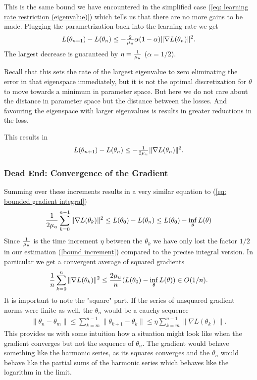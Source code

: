 %
This is the same bound we have encountered in the simplified case (\ref{eq:
learning rate restriction (eigenvalue)}) which tells us that there are no more
gains to be made. Plugging the parametrization back into the learning rate we
get
%
\begin{align*}
	L(\theta_{n+1}) - L(\theta_n)
	\le - \tfrac{2}{\mu_u}\alpha (1-\alpha)\|\nabla L(\theta_n)\|^2.
\end{align*}
%
The largest decrease is guaranteed by \(\eta=\tfrac{1}{\mu_u}\) (\(\alpha=1/2\)).
\begin{remark}
	Recall that this sets the rate of the largest eigenvalue to zero eliminating
	the error in that eigenspace immediately, but it is not the optimal
	discretization for \(\theta\) to move towards a minimum in parameter space.
	But here we do not care about the distance in parameter space but the
	distance between the losses. And favouring the eigenspace with larger
	eigenvalues is results in greater reductions in the loss.
\end{remark}
This results in
%
\begin{align*}
	L(\theta_{n+1}) - L(\theta_n)
	\le - \tfrac{1}{2\mu_u}\|\nabla L(\theta_n)\|^2.
\end{align*}
%
\subsubsection{Dead End: Convergence of the Gradient}

Summing over these increments results in a very similar equation to
(\ref{eq: bounded gradient integral})
%
\begin{align*}
	\frac{1}{2\mu_u} \sum_{k=0}^{n-1}\|\nabla L(\theta_k)\|^2
	\le L(\theta_0) - L(\theta_n)
	\le L(\theta_0) - \inf_{\theta} L(\theta)
\end{align*}
%
Since \(\tfrac{1}{\mu_u}\) is the time increment \(\eta\) between the \(\theta_k\)
we have only lost the factor \(1/2\) in our estimation (\ref{bound increment})
compared to the precise integral version.
In particular we get a convergent average of squared gradients
%
\begin{align*}
	\frac{1}{n} \sum_{k=0}^n \|\nabla L(\theta_k)\|^2
	\le \frac{2 \mu_u}{n} (L(\theta_0) - \inf_\theta L(\theta)) \in O(1/n).
\end{align*}
%
It is important to note the "square" part. If the series of unsquared gradient
norms were finite as well, the \(\theta_n\) would be a cauchy sequence
%
\begin{align*}
	\|\theta_n - \theta_m \|
	\le \sum_{k=m}^{n-1} \|\theta_{k+1} - \theta_k\|
	\le \eta \sum_{k=m}^{n-1} \|\nabla L(\theta_k)\|.
\end{align*}
%
This provides us with some intuition how a situation might look like when the
gradient converges but not the sequence of \(\theta_n\). The gradient would
behave something like the harmonic series, as its squares converges and the
\(\theta_n\) would behave like the partial sums of the harmonic series which
behaves like the logarithm in the limit.

